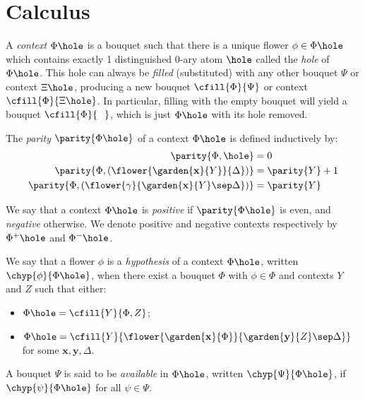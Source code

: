 \section{Calculus}


\begin{definition}[Context]
  A \emph{context} $\Phi\hole$ is a bouquet such that there is a unique flower
  $\phi \in \Phi\hole$ which contains exactly 1 distinguished 0-ary atom $\hole$
  called the \emph{hole} of $\Phi\hole$. This hole can always be \emph{filled}
  (substituted) with any other bouquet $\Psi$ or context $\Xi\hole$, producing a
  new bouquet $\cfill{\Phi}{\Psi}$ or context $\cfill{\Phi}{\Xi\hole}$. In
  particular, filling with the empty bouquet will yield a bouquet
  $\cfill{\Phi}{\phantom{\Phi}}$, which is just $\Phi\hole$ with its hole removed.
\end{definition}

\begin{definition}[Parity]
  The \emph{parity} $\parity{\Phi\hole}$ of a context $\Phi\hole$ is defined inductively by:
  \begin{align*}
    \parity{\Phi, \hole} &= 0 \\
    \parity{\Phi, (\flower{\garden{\mathbf{x}}{Y}}{\Delta})} &= \parity{Y} + 1 \\
    \parity{\Phi, (\flower{\gamma}{\garden{\mathbf{x}}{Y} \sep \Delta})} &= \parity{Y}
  \end{align*}
\end{definition}

\begin{definition}[Polarity]
  We say that a context $\Phi\hole$ is \emph{positive} if $\parity{\Phi\hole}$ is even, and
  \emph{negative} otherwise. We denote positive and negative contexts
  respectively by $\Phi^+\hole$ and $\Phi^-\hole$.
\end{definition}

\begin{definition}[Hypothesis]
  We say that a flower $\phi$ is a \emph{hypothesis} of a context $\Phi\hole$, written
  $\chyp{\phi}{\Phi\hole}$, when there exist a bouquet $\Phi$ with $\phi \in \Phi$ and
  contexts $Y$ and $Z$ such that either:
  \begin{itemize}
    \item $\Phi\hole = \cfill{Y}{\Phi, Z}$;
    \item $\Phi\hole =
    \cfill{Y}{\flower{\garden{\mathbf{x}}{\Phi}}{\garden{\mathbf{y}}{Z}
    \sep \Delta}}$ for some $\mathbf{x}, \mathbf{y}, \Delta$.
  \end{itemize}
  A bouquet $\Psi$ is said to be \emph{available} in $\Phi\hole$, written
  $\chyp{\Psi}{\Phi\hole}$, if $\chyp{\psi}{\Phi\hole}$ for all $\psi \in \Psi$.
\end{definition}

